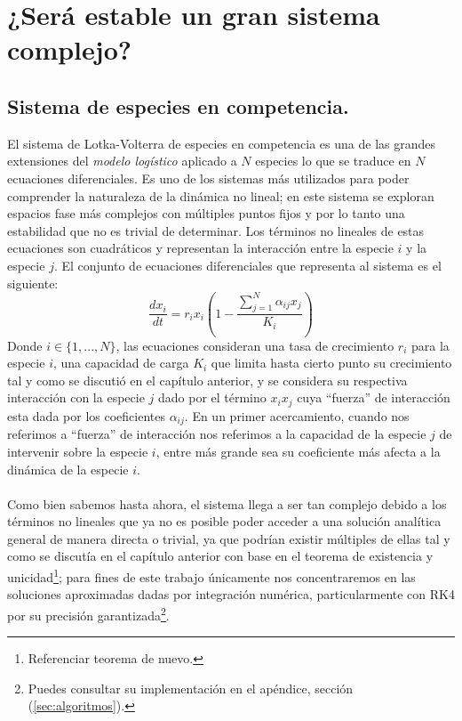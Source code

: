 \chapter{¿Será estable un gran sistema complejo?}

\section{Sistema de especies en competencia.}

El sistema de Lotka-Volterra de especies en competencia es una de las grandes extensiones del \textit{modelo logístico} aplicado a $N$ especies lo que se traduce en $N$ ecuaciones diferenciales. Es uno de los sistemas más utilizados para poder comprender la naturaleza de la dinámica no lineal; en este sistema se exploran espacios fase más complejos con múltiples puntos fijos y por lo tanto una estabilidad que no es trivial de determinar. Los términos no lineales de estas ecuaciones son cuadráticos y representan la interacción entre la especie $i$ y la especie $j$. El conjunto de ecuaciones diferenciales que representa al sistema es el siguiente:
\begin{equation}\label{eqn:LK}
	\frac{dx_i}{dt}=r_ix_i\left(1-\frac{\sum_{j=1}^N \alpha_{ij}x_j}{K_i}\right)
\end{equation}
Donde $i\in\{1,...,N\}$, las ecuaciones consideran una tasa de crecimiento $r_i$ para la especie $i$, una capacidad de carga $K_i$ que limita hasta cierto punto su crecimiento tal y como se discutió en el capítulo anterior, y se considera su respectiva interacción con la especie $j$ dado por el término $x_ix_j$ cuya ``fuerza'' de interacción esta dada por los coeficientes $\alpha_{ij}$. En un primer acercamiento, cuando nos referimos a ``fuerza'' de interacción nos referimos a la capacidad de la especie $j$ de intervenir sobre la especie $i$, entre más grande sea su coeficiente más afecta a la dinámica de la especie $i$.\\
\\
Como bien sabemos hasta ahora, el sistema llega a ser tan complejo debido a los términos no lineales que ya no es posible poder acceder a una solución analítica general de manera directa o trivial, ya que podrían existir múltiples de ellas tal y como se discutía en el capítulo anterior con base en el teorema de existencia y unicidad\footnote{Referenciar teorema de nuevo.}; para fines de este trabajo únicamente nos concentraremos en las soluciones aproximadas dadas por integración numérica, particularmente con RK4 por su precisión garantizada\footnote{Puedes consultar su implementación en el apéndice, sección (\ref{sec:algoritmos}).}.
